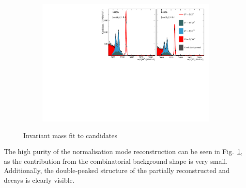 \begin{figure}[!h]
    \centering
    \begin{subfigure}[t]{1.0\textwidth}
        \includegraphics[width=1.0\textwidth]{figs/Appendix_FitCategories/canvas_DsD0_merged_both_summed_splitHel_splitKKPi_s21_s21r1_s24_s26.pdf}
    \end{subfigure}
    \caption{Invariant mass fit to \decay{\Bp}{\Dsp\Dzb} candidates}
    \label{fig:B2DsPhi_Norm_Fit}
\end{figure}

The high purity of the normalisation mode reconstruction can be seen in Fig.~\ref{fig:B2DsPhi_Norm_Fit}, as the contribution from the combinatorial background shape is very small. Additionally, the double-peaked structure of the partially reconstructed \decay{\Bp}{\Dssp\Dzb} and \decay{\Bp}{\Dsp\Dstarzb} decays is clearly visible. 



